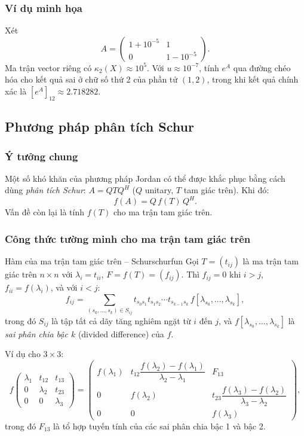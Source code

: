 \documentclass[12pt,a4paper]{report}
\begin{document}
\subsubsection{Ví dụ minh họa}

Xét
\[
  A = \begin{pmatrix} 1 + 10^{-5} & 1 \\ 0 & 1 - 10^{-5} \end{pmatrix}.
\]
Ma trận vector riêng có $\kappa_2(X) \approx 10^5$. Với $u \approx 10^{-7}$, tính
$e^A$ qua đường chéo hóa cho kết quả sai ở chữ số thứ 2 của phần tử $(1,2)$, trong
khi kết quả chính xác là $[e^A]_{12} \approx 2.718282$.

\subsection{Phương pháp phân tích Schur}

\subsubsection{Ý tưởng chung}

Một số khó khăn của phương pháp Jordan có thể được khắc phục bằng cách dùng
\emph{phân tích Schur}: $A = Q T Q^H$ ($Q$ unitary, $T$ tam giác trên). Khi đó:
\[
  f(A) = Q \, f(T) \, Q^H.
\]
Vấn đề còn lại là tính $f(T)$ cho ma trận tam giác trên.

\subsubsection{Công thức tường minh cho ma trận tam giác trên}

\begin{theorem}{Hàm của ma trận tam giác trên -- Schur}{schurfun}
Gọi $T = (t_{ij})$ là ma trận tam giác trên $n \times n$ với $\lambda_i = t_{ii}$,
$F = f(T) = (f_{ij})$. Thì $f_{ij} = 0$ khi $i > j$, $f_{ii} = f(\lambda_i)$, và với
$i < j$:
\[
  f_{ij} = \sum_{(s_0,\ldots,s_k) \in S_{ij}}
           t_{s_0 s_1} t_{s_1 s_2} \cdots t_{s_{k-1} s_k}
           \, f[\lambda_{s_0}, \ldots, \lambda_{s_k}],
\]
trong đó $S_{ij}$ là tập tất cả dãy tăng nghiêm ngặt từ $i$ đến $j$, và
$f[\lambda_{s_0},\ldots,\lambda_{s_k}]$ là \emph{sai phân chia bậc $k$} (divided difference)
của $f$.
\end{theorem}

Ví dụ cho $3\times 3$:
\[
  f\!\begin{pmatrix}\lambda_1 & t_{12} & t_{13} \\ 0 & \lambda_2 & t_{23} \\ 0 & 0 & \lambda_3\end{pmatrix}
  =
  \begin{pmatrix}
    f(\lambda_1) & t_{12}\dfrac{f(\lambda_2)-f(\lambda_1)}{\lambda_2-\lambda_1} & F_{13} \\[8pt]
    0 & f(\lambda_2) & t_{23}\dfrac{f(\lambda_3)-f(\lambda_2)}{\lambda_3-\lambda_2} \\[8pt]
    0 & 0 & f(\lambda_3)
  \end{pmatrix},
\]
trong đó $F_{13}$ là tổ hợp tuyến tính của các sai phân chia bậc 1 và bậc 2.
\end{document}
